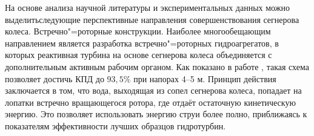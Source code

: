 На основе анализа научной литературы и экспериментальных данных можно выделитьследующие перспективные направления совершенствования сегнерова колеса.
Встречно"=роторные конструкции. Наиболее многообещающим направлением является разработка встречно"=роторных гидроагрегатов, в которых реактивная турбина на основе сегнерова колеса объединяется с дополнительным активным рабочим органом. Как показано в работе \cite{bozarov2024b}, такая схема позволяет достичь КПД до $93{,}5\%$ при напорах 4--5 м. Принцип действия заключается в том, что вода, выходящая из сопел сегнерова колеса, попадает на лопатки встречно вращающегося ротора, где отдаёт остаточную кинетическую энергию. Это позволяет использовать энергию струи более полно, приближаясь к показателям эффективности лучших образцов гидротурбин.


